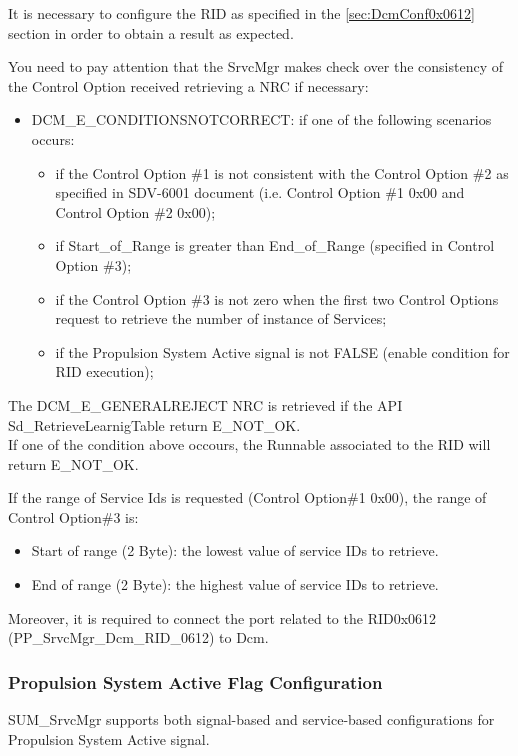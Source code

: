 It is necessary to configure the RID as specified in the \ref{sec:DcmConf0x0612} section in order to obtain a result as expected. 

You need to pay attention that the SrvcMgr makes check over the consistency of the Control Option received retrieving a NRC if necessary:
\begin{itemize}
\item DCM\_E\_CONDITIONSNOTCORRECT: if one of the following scenarios occurs:
		\begin{itemize}
		\item if the Control Option \#1 is not consistent with the Control Option \#2 as specified in SDV-6001 document (i.e. Control Option \#1 0x00 and Control Option \#2 0x00); 
		\item if Start\_of\_Range is greater than End\_of\_Range (specified in Control Option \#3);
		\item if the Control Option \#3 is not zero when the first two Control Options request to retrieve the number of instance of Services;
		\item if the Propulsion System Active signal is not FALSE (enable condition for RID execution);
		\end{itemize}
\end{itemize}

The DCM\_E\_GENERALREJECT NRC is retrieved if the API Sd\_RetrieveLearnigTable return E\_NOT\_OK.
\\If one of the condition above occours, the Runnable associated to the RID will return E\_NOT\_OK. 


If the range of Service Ids is requested (Control Option\#1 0x00), the range of Control Option\#3 is:
\begin{itemize}
  \item Start of range (2 Byte): the lowest value of service IDs to retrieve.
  \item End of range (2 Byte): the highest value of service IDs to retrieve.
  \end{itemize}

Moreover, it is required to connect the port related to the RID0x0612 (PP\_SrvcMgr\_Dcm\_RID\_0612) to Dcm.

\subsubsection{Propulsion System Active Flag Configuration}
\label{sec:propsysactflag}
SUM\_SrvcMgr supports both signal-based and service-based configurations for Propulsion System Active signal.

